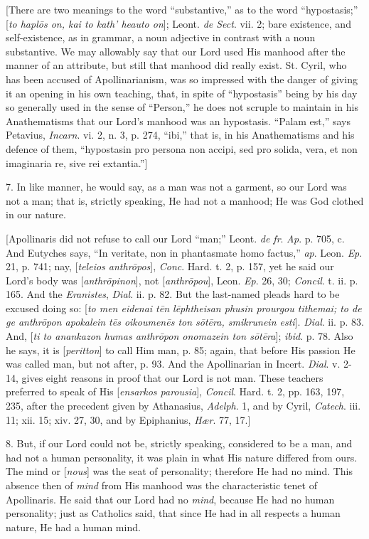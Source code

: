 [There are two meanings to the word ``substantive,'' as to
the word ``hypostasis;'' [\emph{to hapl\={o}s on, kai to kath'
heauto on}]; Leont. \emph{de Sect}. vii. 2; bare existence, and
self-existence, as in grammar, a noun adjective in contrast with a
noun substantive. We may allowably say that our Lord used His manhood
after the manner of an attribute, but still that manhood did really
exist. St. Cyril, who has been accused of Apollinarianism, was so
impressed with the danger of giving it an opening in his own teaching,
that, in spite of ``hypostasis'' being by his day so generally
used in the sense of ``Person,'' he does not scruple to
maintain in his Anathematisms that our Lord's manhood was an
hypostasis. ``Palam est,'' says Petavius, \emph{Incarn}. vi.
2, n. 3, p. 274, ``ibi,'' that is, in his Anathematisms and
his defence of them, ``hypostasin pro persona non accipi, sed pro
solida, vera, et non imaginaria re, sive rei extantia.'']

7. In like manner, he would say, as a man was not a garment, so our
Lord was not a man; that is, strictly speaking, He had not a manhood;
He was God clothed in our nature.

[Apollinaris did not refuse to call our Lord ``man;'' Leont.
\emph{de fr}. \emph{Ap}. p. 705, c. And Eutyches says, ``In
veritate, non in phantasmate homo factus,'' \emph{ap}. Leon. \emph{Ep}.
21, p. 741; nay, [\emph{teleios anthr\={o}pos}], \emph{Conc}. Hard.
t. 2, p. 157, yet he said our Lord's body was [\emph{anthr\={o}pinon}],
not [\emph{anthr\={o}pou}], Leon. \emph{Ep}. 26, 30; \emph{Concil}.
t. ii. p. 165. And the \emph{Eranistes}, \emph{Dial}. ii. p. 82. But
the last-named pleads hard to be excused doing so: [\emph{to men eidenai
t\={e}n l\={e}phtheisan phusin prourgou tithemai; to de ge anthr\={o}pon
apokalein t\={e}s oikoumen\={e}s ton s\={o}t\={e}ra,
smikrunein esti}]. \emph{Dial}. ii. p. 83. And, [\emph{ti to anankazon
humas anthr\={o}pon onomazein ton s\={o}t\={e}ra}]; \emph{ibid}.
p. 78. Also he says, it is [\emph{peritton}] to call Him man, p. 85;
again, that before His passion He was called man, but not after, p.
93. And the Apollinarian in Incert. \emph{Dial}. v. 2-14, gives eight
reasons in proof that our Lord is not man. These teachers preferred to
speak of His [\emph{ensarkos parousia}], \emph{Concil}. Hard. t. 2,
pp. 163, 197, 235, after the precedent given by Athanasius, \emph{Adelph}.
1, and by Cyril, \emph{Catech}. iii. 11; xii. 15; xiv. 27, 30, and by
Epiphanius, \emph{Hær}. 77, 17.]

8. But, if our Lord could not be, strictly speaking, considered to
be a man, and had not a human personality, it was plain in what His
nature differed from ours. The mind or [\emph{nous}] was the seat of
personality; therefore He had no mind. This absence then of \emph{mind}
from His manhood was the characteristic tenet of Apollinaris. He said
that our Lord had no \emph{mind}, because He had no human personality;
just as Catholics said, that since He had in all respects a human
nature, He had a human mind.

